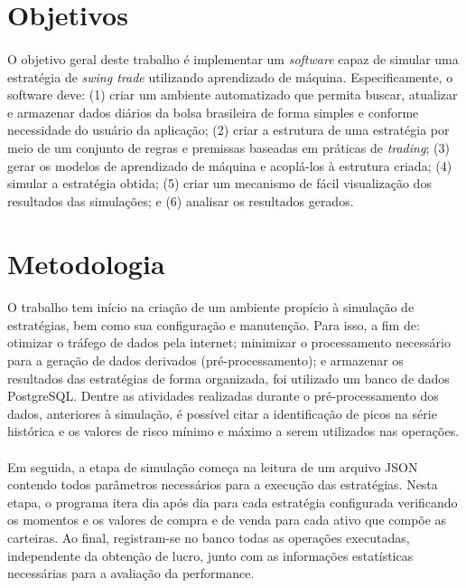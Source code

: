 \FloatBarrier
\section{Objetivos}

\paragraph{} O objetivo geral deste trabalho é implementar um \textit{software} capaz de simular uma estratégia de \textit{swing trade} utilizando aprendizado de máquina. Especificamente, o software deve: (1) criar um ambiente automatizado que permita buscar, atualizar e armazenar dados diários da bolsa brasileira de forma simples e conforme necessidade do usuário da aplicação; (2) criar a estrutura de uma estratégia por meio de um conjunto de regras e premissas baseadas em práticas de \textit{trading}; (3) gerar os modelos de aprendizado de máquina e acoplá-los à estrutura criada; (4) simular a estratégia obtida; (5) criar um mecanismo de fácil visualização dos resultados das simulações; e (6) analisar os resultados gerados.



\FloatBarrier
\section{Metodologia}

\paragraph{} O trabalho tem início na criação de um ambiente propício à simulação de estratégias, bem como sua configuração e manutenção. Para isso, a fim de: otimizar o tráfego de dados pela internet; minimizar o processamento necessário para a geração de dados derivados (pré-processamento); e armazenar os resultados das estratégias de forma organizada, foi utilizado um banco de dados PostgreSQL. Dentre as atividades realizadas durante o pré-processamento dos dados, anteriores à simulação, é possível citar a identificação de picos na série histórica e os valores de risco mínimo e máximo a serem utilizados nas operações.

\paragraph{} Em seguida, a etapa de simulação começa na leitura de um arquivo JSON contendo todos parâmetros necessários para a execução das estratégias. Nesta etapa, o programa itera dia após dia para cada estratégia configurada verificando os momentos e os valores de compra e de venda para cada ativo que compõe as carteiras. Ao final, registram-se no banco todas as operações executadas, independente da obtenção de lucro, junto com as informações estatísticas necessárias para a avaliação da performance.

